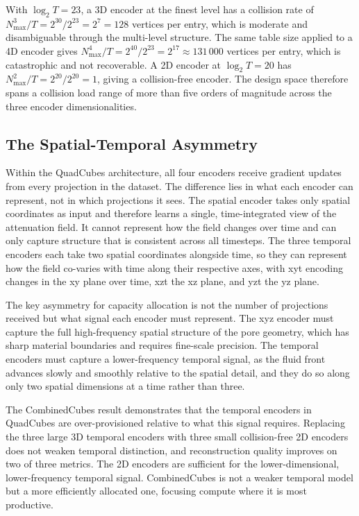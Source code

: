 \documentclass[12pt, a4paper, twoside]{report}
\begin{document}
With $\log_2 T = 23$, a 3D encoder at the finest level has a collision rate of $N_\mathrm{max}^3 / T = 2^{30} / 2^{23} = 2^7 = 128$ vertices per entry, which is moderate and disambiguable through the multi-level structure. The same table size applied to a 4D encoder gives $N_\mathrm{max}^4 / T = 2^{40} / 2^{23} = 2^{17} \approx 131\,000$ vertices per entry, which is catastrophic and not recoverable. A 2D encoder at $\log_2 T = 20$ has $N_\mathrm{max}^2 / T = 2^{20} / 2^{20} = 1$, giving a collision-free encoder. The design space therefore spans a collision load range of more than five orders of magnitude across the three encoder dimensionalities.

\subsection{The Spatial-Temporal Asymmetry}
\label{subsec:spatial_temporal_theory}

Within the QuadCubes architecture, all four encoders receive gradient updates from every projection in the dataset. The difference lies in what each encoder can represent, not in which projections it sees. The spatial encoder takes only spatial coordinates as input and therefore learns a single, time-integrated view of the attenuation field. It cannot represent how the field changes over time and can only capture structure that is consistent across all timesteps. The three temporal encoders each take two spatial coordinates alongside time, so they can represent how the field co-varies with time along their respective axes, with xyt encoding changes in the xy plane over time, xzt the xz plane, and yzt the yz plane.

The key asymmetry for capacity allocation is not the number of projections received but what signal each encoder must represent. The xyz encoder must capture the full high-frequency spatial structure of the pore geometry, which has sharp material boundaries and requires fine-scale precision. The temporal encoders must capture a lower-frequency temporal signal, as the fluid front advances slowly and smoothly relative to the spatial detail, and they do so along only two spatial dimensions at a time rather than three.

The CombinedCubes result demonstrates that the temporal encoders in QuadCubes are over-provisioned relative to what this signal requires. Replacing the three large 3D temporal encoders with three small collision-free 2D encoders does not weaken temporal distinction, and reconstruction quality improves on two of three metrics. The 2D encoders are sufficient for the lower-dimensional, lower-frequency temporal signal. CombinedCubes is not a weaker temporal model but a more efficiently allocated one, focusing compute where it is most productive.
\end{document}
